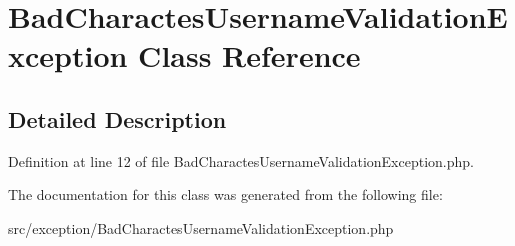 \hypertarget{classcommon_1_1user_1_1exception_1_1_bad_charactes_username_validation_exception}{\section{\-Bad\-Charactes\-Username\-Validation\-Exception \-Class \-Reference}
\label{classcommon_1_1user_1_1exception_1_1_bad_charactes_username_validation_exception}
}


\subsection{\-Detailed \-Description}


\-Definition at line 12 of file \-Bad\-Charactes\-Username\-Validation\-Exception.\-php.



\-The documentation for this class was generated from the following file\-:\begin{DoxyCompactItemize}
\item 
src/exception/\-Bad\-Charactes\-Username\-Validation\-Exception.\-php\end{DoxyCompactItemize}
